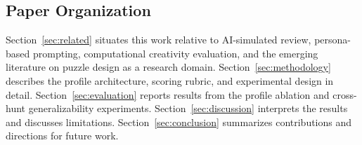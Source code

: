 \subsection{Paper Organization}

Section~\ref{sec:related} situates this work relative to AI-simulated review, persona-based
prompting, computational creativity evaluation, and the emerging literature on puzzle design
as a research domain. Section~\ref{sec:methodology} describes the profile architecture,
scoring rubric, and experimental design in detail. Section~\ref{sec:evaluation} reports
results from the profile ablation and cross-hunt generalizability experiments.
Section~\ref{sec:discussion} interprets the results and discusses limitations.
Section~\ref{sec:conclusion} summarizes contributions and directions for future work.
